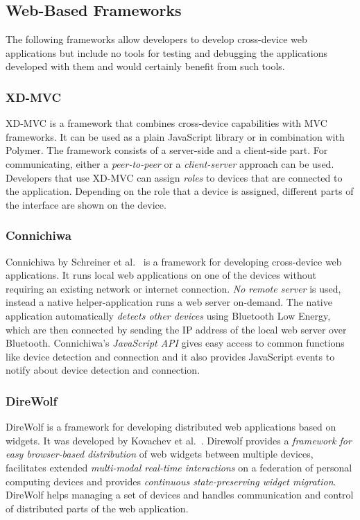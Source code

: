 \subsection{Web-Based Frameworks}

The following frameworks allow developers to develop cross-device web applications but include no tools for testing and debugging the applications developed with them and would certainly benefit from such tools.

\subsubsection{XD-MVC}

XD-MVC is a framework that combines cross-device capabilities with MVC frameworks. It can be used as a plain JavaScript library or in combination with Polymer. The framework consists of a server-side and a client-side part. For communicating, either a \emph{peer-to-peer} or a \emph{client-server} approach can be used. Developers that use XD-MVC can assign \emph{roles} to devices that are connected to the application. Depending on the role that a device is assigned, different parts of the interface are shown on the device. 

\subsubsection{Connichiwa}

Connichiwa by Schreiner et al.~\cite{connichiwa2015} is a framework for developing cross-device web applications. It runs local web applications on one of the devices without requiring an existing network or internet connection. \emph{No remote server} is used, instead a native helper-application runs a web server on-demand. The native application automatically \emph{detects other devices} using Bluetooth Low Energy, which are then connected by sending the IP address of the local web server over Bluetooth. Connichiwa's \emph{JavaScript API} gives easy access to common functions like device detection and connection and it also provides JavaScript events to notify about device detection and connection.

\subsubsection{DireWolf}

DireWolf is a framework for developing distributed web applications based on widgets. It was developed by Kovachev et al.~\cite{direwolf2013}. Direwolf provides a \emph{framework for easy browser-based distribution} of web widgets between multiple devices, facilitates extended \emph{multi-modal real-time interactions} on a federation of personal computing devices and provides \emph{continuous state-preserving widget migration}. DireWolf helps managing a set of devices and handles communication and control of distributed parts of the web application. 

